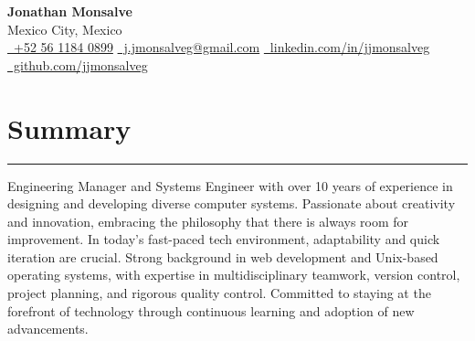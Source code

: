 \documentclass[a4paper,10pt]{article}
\begin{document}
\begin{center}
    {\LARGE \textbf{Jonathan Monsalve}} \\[0.5em]
    Mexico City, Mexico \\[0.75em]
    \href{tel:+525611840899}{\faPhone\ +52 56 1184 0899} \hspace{1em}
    \href{mailto:j.jmonsalveg@gmail.com}{\faEnvelope\ j.jmonsalveg@gmail.com} \hspace{1em}
    \href{https://www.linkedin.com/in/jjmonsalveg/}{\faLinkedin\ linkedin.com/in/jjmonsalveg} \\[0.5em]
    \href{https://github.com/jjmonsalveg}{\faGithub\ github.com/jjmonsalveg}
\end{center}

\vspace{0.5em}

\newcommand{\sectionline}{
	\noindent\rule{\linewidth}{0.4pt}\vspace{0.1em}
}

\section*{Summary}
\sectionline
Engineering Manager and Systems Engineer with over 10 years of experience in
designing and developing diverse computer systems. Passionate about creativity
and innovation, embracing the philosophy that there is always room for
improvement. In today's fast-paced tech environment, adaptability and quick
iteration are crucial. Strong background in web development and Unix-based
operating systems, with expertise in multidisciplinary teamwork, version
control, project planning, and rigorous quality control. Committed to staying
at the forefront of technology through continuous learning and adoption of
new advancements.

\end{document}
